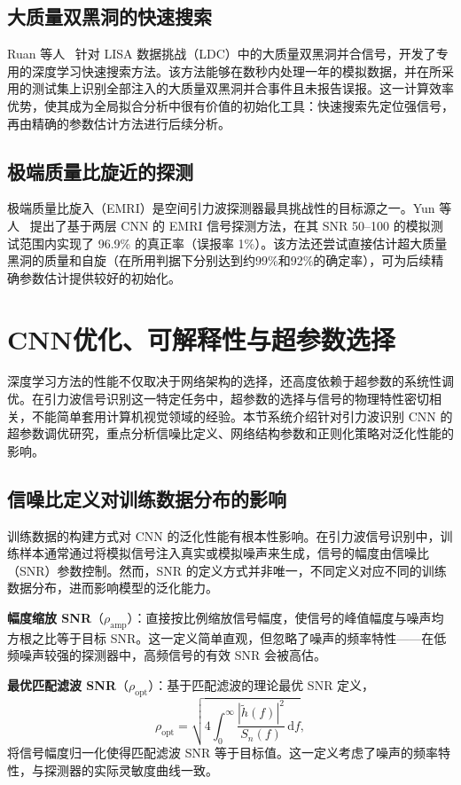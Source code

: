 \subsection{大质量双黑洞的快速搜索}

Ruan 等人~\cite{ruan2023mbhb} 针对 LISA 数据挑战（LDC）中的大质量双黑洞并合信号，开发了专用的深度学习快速搜索方法。该方法能够在数秒内处理一年的模拟数据，并在所采用的测试集上识别全部注入的大质量双黑洞并合事件且未报告误报。这一计算效率优势，使其成为全局拟合分析中很有价值的初始化工具：快速搜索先定位强信号，再由精确的参数估计方法进行后续分析。

\subsection{极端质量比旋近的探测}

极端质量比旋入（EMRI）是空间引力波探测器最具挑战性的目标源之一。Yun 等人~\cite{yun2024emri} 提出了基于两层 CNN 的 EMRI 信号探测方法，在其 SNR 50--100 的模拟测试范围内实现了 96.9\% 的真正率（误报率 1\%）。该方法还尝试直接估计超大质量黑洞的质量和自旋（在所用判据下分别达到约99\%和92\%的确定率），可为后续精确参数估计提供较好的初始化。

\section{CNN优化、可解释性与超参数选择}

深度学习方法的性能不仅取决于网络架构的选择，还高度依赖于超参数的系统性调优。在引力波信号识别这一特定任务中，超参数的选择与信号的物理特性密切相关，不能简单套用计算机视觉领域的经验。本节系统介绍针对引力波识别 CNN 的超参数调优研究，重点分析信噪比定义、网络结构参数和正则化策略对泛化性能的影响。

\subsection{信噪比定义对训练数据分布的影响}

训练数据的构建方式对 CNN 的泛化性能有根本性影响。在引力波信号识别中，训练样本通常通过将模拟信号注入真实或模拟噪声来生成，信号的幅度由信噪比（SNR）参数控制。然而，SNR 的定义方式并非唯一，不同定义对应不同的训练数据分布，进而影响模型的泛化能力。

\textbf{幅度缩放 SNR}（$\rho_\mathrm{amp}$）：直接按比例缩放信号幅度，使信号的峰值幅度与噪声均方根之比等于目标 SNR。这一定义简单直观，但忽略了噪声的频率特性——在低频噪声较强的探测器中，高频信号的有效 SNR 会被高估。

\textbf{最优匹配滤波 SNR}（$\rho_\mathrm{opt}$）：基于匹配滤波的理论最优 SNR 定义，
\begin{equation}
  \rho_\mathrm{opt} = \sqrt{4\int_0^\infty \frac{|\tilde{h}(f)|^2}{S_n(f)}\,\mathrm{d}f},
\end{equation}
将信号幅度归一化使得匹配滤波 SNR 等于目标值。这一定义考虑了噪声的频率特性，与探测器的实际灵敏度曲线一致。


